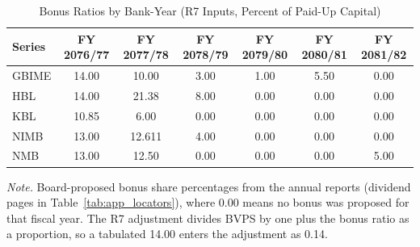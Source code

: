 \begin{table}[!htbp]
\centering
\footnotesize
\setlength{\tabcolsep}{2pt}
\caption{Bonus Ratios by Bank-Year (R7 Inputs, Percent of Paid-Up Capital)}
\label{tab:app_bonus_ratios}
\begin{tabular}{lcccccc}
\toprule
\textbf{Series} & \textbf{FY 2076/77} & \textbf{FY 2077/78} & \textbf{FY 2078/79} & \textbf{FY 2079/80} & \textbf{FY 2080/81} & \textbf{FY 2081/82} \\
\midrule
GBIME & 14.00 & 10.00 & 3.00 & 1.00 & 5.50 & 0.00 \\
HBL & 14.00 & 21.38 & 8.00 & 0.00 & 0.00 & 0.00 \\
KBL & 10.85 & 6.00 & 0.00 & 0.00 & 0.00 & 0.00 \\
NIMB & 13.00 & 12.611 & 4.00 & 0.00 & 0.00 & 0.00 \\
NMB & 13.00 & 12.50 & 0.00 & 0.00 & 0.00 & 5.00 \\
\bottomrule
\end{tabular}

\vspace{4pt}
\begin{minipage}{\linewidth}
\footnotesize
\textit{Note.} Board-proposed bonus share percentages from the annual reports (dividend pages in Table~\ref{tab:app_locators}), where 0.00 means no bonus was proposed for that fiscal year. The R7 adjustment divides BVPS by one plus the bonus ratio as a proportion, so a tabulated 14.00 enters the adjustment as 0.14.
\end{minipage}
\end{table}

